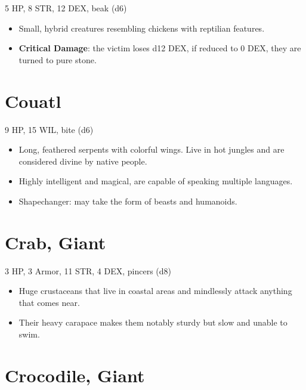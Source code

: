 \documentclass[
  10pt,
  american,
]{article}
\begin{document}
5 HP, 8 STR, 12 DEX, beak (d6)

\begin{samepage}
\begin{itemize}
\setlength\itemsep{-.5em}
\item Small, hybrid creatures resembling chickens with reptilian features.
\item \textbf{Critical Damage}: the victim loses d12 DEX, if reduced to 0 DEX, they are turned to pure stone.
\end{itemize}
\end{samepage}

\hypertarget{couatl}{%
\section{Couatl}\label{couatl}}

9 HP, 15 WIL, bite (d6)

\begin{samepage}
\begin{itemize}
\setlength\itemsep{-.5em}
\item Long, feathered serpents with colorful wings.   Live in hot jungles and are considered divine by native people.
\item Highly intelligent and magical, are capable of speaking multiple languages.
\item Shapechanger: may take the form of beasts and humanoids.
\end{itemize}
\end{samepage}

\hypertarget{crab-giant}{%
\section{Crab, Giant}\label{crab-giant}}

3 HP, 3 Armor, 11 STR, 4 DEX, pincers (d8)

\begin{samepage}
\begin{itemize}
\setlength\itemsep{-.5em}
\item Huge crustaceans that live in coastal areas and mindlessly attack anything that comes near.
\item Their heavy carapace makes them notably sturdy but slow and unable to swim.
\end{itemize}
\end{samepage}

\hypertarget{crocodile-giant}{%
\section{Crocodile, Giant}\label{crocodile-giant}}
\end{document}
